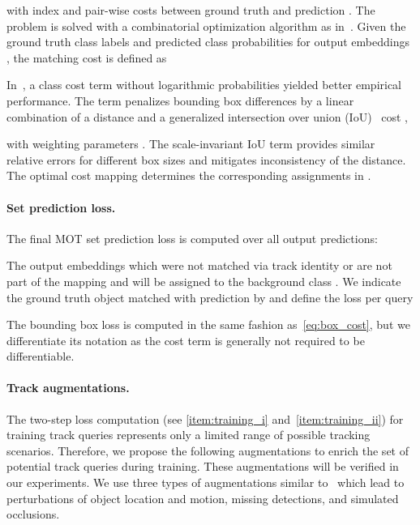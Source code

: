 \documentclass[10pt,twocolumn,letterpaper]{article}
\begin{document}
with index  and pair-wise costs  between ground truth  and prediction .
The problem is solved with a combinatorial optimization algorithm as in~\cite{stewart2016end}.
Given the ground truth class labels  and predicted class probabilities  for output embeddings , the matching cost  is defined as

In~\cite{DETR}, a class cost term without logarithmic probabilities yielded  better empirical performance.
The  term penalizes bounding box differences by a linear combination of a  distance and a generalized intersection over union (IoU)~\cite{giou} cost ,

with weighting parameters .
The scale-invariant IoU term provides similar relative errors for different box sizes and mitigates inconsistency of the  distance.
The optimal cost mapping  determines the corresponding assignments in .

\paragraph{Set prediction loss.} \label{sec:set_loss}
The final MOT set prediction loss is computed over all  output predictions:

The output embeddings which were not matched via track identity or  are not part of the mapping  and will be assigned to the background class .
We indicate the ground truth object matched with prediction  by  and define the loss per query

The bounding box loss  is computed in the same fashion as~\eqref{eq:box_cost}, but we differentiate its notation as the cost term  is generally not required to be differentiable.


\paragraph{Track augmentations.}
The two-step loss computation (see \ref{item:training_i} and~\ref{item:training_ii}) for training track queries represents only a limited range of possible tracking scenarios.
Therefore, we propose the following augmentations to enrich the set of potential track queries during training.
These augmentations will be verified in our experiments.
We use three types of augmentations similar to~\cite{center_track} which lead to perturbations of object location and motion, missing detections, and simulated occlusions.
\end{document}
